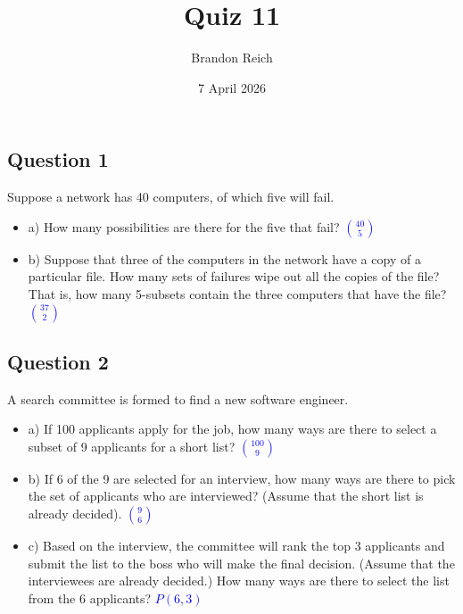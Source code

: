 \documentclass{article}
\title{Quiz 11}
\author{Brandon Reich}
\date{7 April 2026}
\begin{document}
\maketitle

\subsection*{Question 1}
Suppose a network has 40 computers, of which five will fail. 

\begin{itemize}
    \item a) How many possibilities are there for the five that fail?
    \textcolor{blue}{$\binom{40}{5}$}
    \item b) Suppose that three of the computers in the network have a copy of a particular file. How many sets of failures wipe out all the copies of the file? That is, how many 5-subsets contain the three computers that have the file?
    \textcolor{blue}{$\binom{37}{2}$}
\end{itemize}

\subsection*{Question 2}
A search committee is formed to find a new software engineer.

\begin{itemize}
    \item a) If 100 applicants apply for the job, how many ways are there to select a subset of 9 applicants for a short list?
    \textcolor{blue}{$\binom{100}{9}$}
    \item b) If 6 of the 9 are selected for an interview, how many ways are there to pick the set of applicants who are interviewed? (Assume that the short list is already decided).
    \textcolor{blue}{$\binom{9}{6}$}
    \item c) Based on the interview, the committee will rank the top 3 applicants and submit the list to the boss who will make the final decision. (Assume that the interviewees are already decided.) How many ways are there to select the list from the 6 applicants?
    \textcolor{blue}{$P(6,3)$}
\end{itemize}
\end{document}
